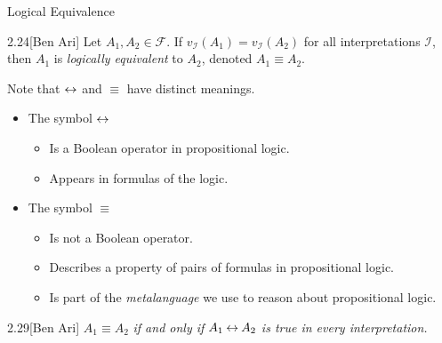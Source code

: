 \documentclass[style=sailor,size=12pt]{powerdot}
\begin{document}
\begin{wideslide}[bm=,toc=]{Logical Equivalence}
\begin{defn}{2.24}[Ben Ari]
Let $A_1,A_2 \in \mathcal{F}$. If $v_{\mathcal{I}}(A_1) = v_{\mathcal{I}}(A_2)$
  for all interpretations $\mathcal{I}$, then $A_1$ is \emph{logically
    equivalent} to $A_2$, denoted $A_1 \equiv A_2$. 
\end{defn}
Note that $\mathbin{\leftrightarrow}$ and $\equiv$ have distinct meanings.
\begin{itemize}
\item The symbol $\mathbin{\leftrightarrow}$
\begin{itemize}
\item Is a Boolean operator in propositional logic.
\item Appears in formulas of the logic.
\end{itemize}

\item The symbol $\equiv$
\begin{itemize}
\item Is not a Boolean operator.
\item Describes a property of pairs of formulas in propositional logic.
\item Is part of the \emph{metalanguage} we use to reason about propositional
logic.
\end{itemize}
\end{itemize}

\begin{thm}{2.29}[Ben Ari]
  $A_1 \equiv A_2$ \emph{if and only if} $A_1 \mathbin{\leftrightarrow} A_2$ \emph{is true in every
    interpretation.}
\end{thm}
\end{wideslide}
\end{document}
